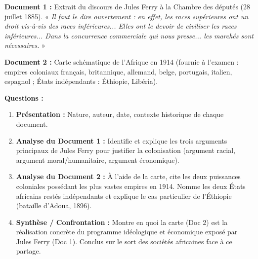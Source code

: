 \documentclass[11pt]{article}
\begin{document}
\begin{exercice}
\textbf{Document 1 :} Extrait du discours de Jules Ferry à la Chambre des députés (28 juillet 1885).
« \textit{Il faut le dire ouvertement : en effet, les races supérieures ont un droit vis-à-vis des races inférieures... Elles ont le devoir de civiliser les races inférieures... Dans la concurrence commerciale qui nous presse... les marchés sont nécessaires. } »

\textbf{Document 2 :} Carte schématique de l'Afrique en 1914 (fournie à l'examen : empires coloniaux français, britannique, allemand, belge, portugais, italien, espagnol ; États indépendants : Éthiopie, Libéria).

\textbf{Questions :}
\begin{enumerate}
    \item \textbf{Présentation :} Nature, auteur, date, contexte historique de chaque document.
    \item \textbf{Analyse du Document 1 :} Identifie et explique les trois arguments principaux de Jules Ferry pour justifier la colonisation (argument racial, argument moral/humanitaire, argument économique).
    \item \textbf{Analyse du Document 2 :} À l'aide de la carte, cite les deux puissances coloniales possédant les plus vastes empires en 1914. Nomme les deux États africains restés indépendants et explique le cas particulier de l'Éthiopie (bataille d'Adoua, 1896).
    \item \textbf{Synthèse / Confrontation :} Montre en quoi la carte (Doc 2) est la réalisation concrète du programme idéologique et économique exposé par Jules Ferry (Doc 1). Conclus sur le sort des sociétés africaines face à ce partage.
\end{enumerate}
\end{exercice}
\end{document}
